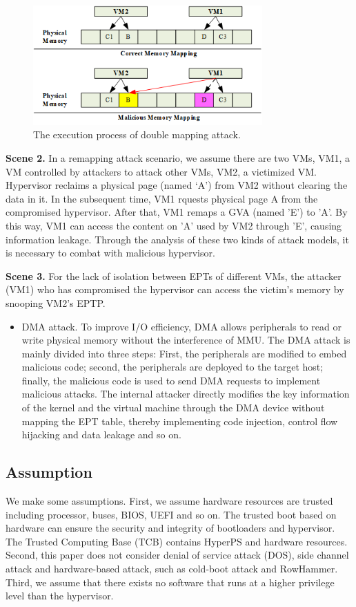 \documentclass[10pt, numbers, preprint ]{sigplanconf}
\begin{document}
{\begin{figure}[htbp]
	\centerline{\includegraphics[height=1.80in]{figures/p2.png}}
	\caption{The execution process of double mapping attack.}
	\label{fg2_expr_dbmp_atk}
\end{figure}

\textbf{Scene 2.} In a remapping attack scenario, we assume there are two VMs, VM1, a VM controlled by attackers to attack other VMs, VM2, a victimized VM. %
 Hypervisor reclaims a physical page (named ‘A’) from VM2 without clearing the data in it. In the subsequent time, VM1 rquests physical page A from the compromised hypervisor. After that, VM1 remaps a GVA (named ’E’) to ’A’. By this way, VM1 can access the content on ’A’ used by VM2 through ’E’, causing information leakage. Through the analysis of these two kinds of attack models, it is necessary to combat with malicious hypervisor.

\textbf{Scene 3.} For the lack of isolation between EPTs of different VMs, the attacker (VM1) who has compromised the hypervisor can access the victim’s memory by snooping VM2’s EPTP.
\begin{itemize}
\item DMA attack. To improve I/O efficiency, DMA allows peripherals to read or write physical memory without the interference of MMU. The DMA attack is mainly divided into three steps: First, the peripherals are modified to embed malicious code; second, the peripherals are deployed to the target host; finally, the malicious code is used to send DMA requests to implement malicious attacks. The internal attacker directly modifies the key information of the kernel and the virtual machine through the DMA device without mapping the EPT table, thereby implementing code injection, control flow hijacking and data leakage and so on.
\end{itemize}

\subsection{Assumption} \label{subsec:assumption}
We make some assumptions. First, we assume hardware resources are trusted including processor, buses, BIOS, UEFI and so on. The trusted boot based on hardware can ensure the security and integrity of bootloaders and hypervisor. The Trusted Computing Base (TCB) contains HyperPS and hardware resources. Second, this paper does not consider denial of service attack (DOS), side channel attack and hardware-based attack, such as cold-boot attack and RowHammer. Third, we assume that there exists no software that runs at a higher privilege level than the hypervisor.

}
\end{document}
